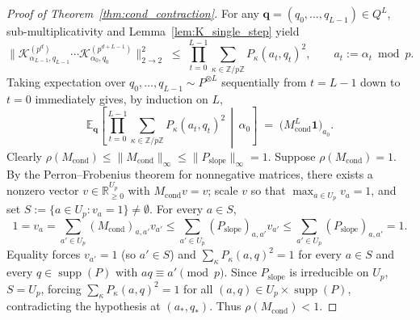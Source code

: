 \documentclass[11pt,a4paper]{article}
\numberwithin{equation}{section}
\theoremstyle{definition}
\theoremstyle{remark}
\newcommand{\Z}{\mathbb{Z}}
\newcommand{\R}{\mathbb{R}}
\newcommand{\E}{\mathbb{E}}
\newcommand{\cK}{\mathcal{K}}
\begin{document}
\begin{proof}[Proof of Theorem~\ref{thm:cond_contraction}]
For any $\boldsymbol{q} = (q_0, \dots, q_{L-1}) \in Q^L$, sub-multiplicativity and Lemma~\ref{lem:K_single_step} yield
\[
\bigl\|\cK_{\alpha_{L-1}, q_{L-1}}^{(p^d)} \cdots \cK_{\alpha_0, q_0}^{(p^{d+L-1})}\bigr\|_{2\to 2}^2 \;\le\; \prod_{t=0}^{L-1} \sum_{\kappa \in \Z/p\Z} P_\kappa(a_t, q_t)^2, \qquad a_t := \alpha_t \bmod p.
\]
Taking expectation over $q_0, \dots, q_{L-1} \sim P^{\otimes L}$ sequentially from $t = L-1$ down to $t = 0$ immediately gives, by induction on $L$,
\[
\E_{\boldsymbol{q}}\!\left[\prod_{t=0}^{L-1} \sum_{\kappa \in \Z/p\Z} P_\kappa(a_t, q_t)^2 \,\middle|\, \alpha_0\right] \;=\; \bigl(M_{\mathrm{cond}}^L \mathbf{1}\bigr)_{a_0}.
\]
Clearly $\rho(M_{\mathrm{cond}}) \le \|M_{\mathrm{cond}}\|_\infty \le \|P_{\mathrm{slope}}\|_\infty = 1$. Suppose $\rho(M_{\mathrm{cond}}) = 1$. By the Perron--Frobenius theorem for nonnegative matrices, there exists a nonzero vector $v \in \R_{\ge 0}^{U_p}$ with $M_{\mathrm{cond}} v = v$; scale $v$ so that $\max_{a \in U_p} v_a = 1$, and set $S := \{a \in U_p : v_a = 1\} \neq \emptyset$. For every $a \in S$,
\[
1 = v_a = \sum_{a' \in U_p} (M_{\mathrm{cond}})_{a, a'} v_{a'} \le \sum_{a' \in U_p} (P_{\mathrm{slope}})_{a, a'} v_{a'} \le \sum_{a' \in U_p} (P_{\mathrm{slope}})_{a, a'} = 1.
\]
Equality forces $v_{a'} = 1$ (so $a' \in S$) and $\sum_\kappa P_\kappa(a, q)^2 = 1$ for every $a \in S$ and every $q \in \operatorname{supp}(P)$ with $aq \equiv a' \pmod p$. Since $P_{\mathrm{slope}}$ is irreducible on $U_p$, $S = U_p$, forcing $\sum_\kappa P_\kappa(a, q)^2 = 1$ for all $(a, q) \in U_p \times \operatorname{supp}(P)$, contradicting the hypothesis at $(a_*, q_*)$. Thus $\rho(M_{\mathrm{cond}}) < 1$.


\end{proof}
\end{document}
